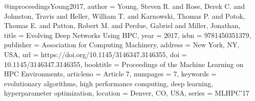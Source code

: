 @inproceedings{Young2017,
   author = {Young, Steven R. and Rose, Derek C. and Johnston, Travis and Heller, William T. and Karnowski, Thomas P. and Potok, Thomas E. and Patton, Robert M. and Perdue, Gabriel and Miller, Jonathan},
   title = {Evolving Deep Networks Using HPC},
   year = {2017},
   isbn = {9781450351379},
   publisher = {Association for Computing Machinery},
   address = {New York, NY, USA},
   url = {https://doi.org/10.1145/3146347.3146355},
   doi = {10.1145/3146347.3146355},
   booktitle = {Proceedings of the Machine Learning on HPC Environments},
   articleno = {Article 7},
   numpages = {7},
   keywords = {evolutionary algorithms, high performance computing, deep learning, hyperparameter optimization},
   location = {Denver, CO, USA},
   series = {MLHPC’17}
}
